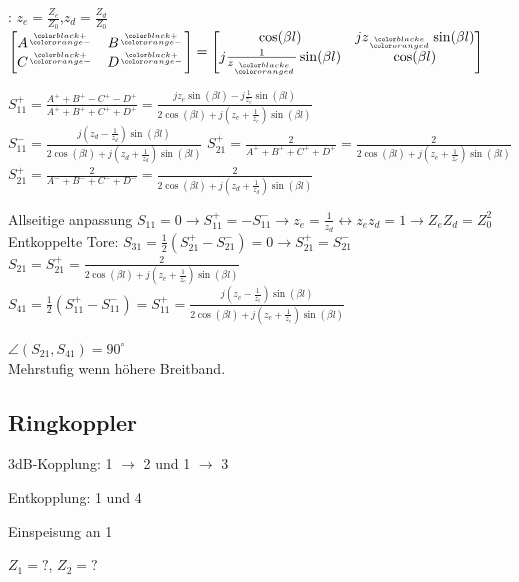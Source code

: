 :
$z_e = \frac{Z_e}{Z_0}$,$z_d = \frac{Z_d}{Z_0}$ \\
$\begin{bmatrix}
    A^\ggt{+}{-} & B^\ggt{+}{-} \\ C^{\ggt{+}{-}} & D^{\ggt{+}{-}}
\end{bmatrix} = \begin{bmatrix}
    \cos(\beta l) & jz_{\ggt{e}{d}}\sin(\beta l) \\
    j\frac{1}{z_{\ggt{e}{d}}}\sin(\beta l) & \cos(\beta l)
\end{bmatrix}$

$S_{11}^+ = \frac{A^+ + B^+ - C^+ - D^+}{A^+ + B^+ + C^+ + D^+} = \frac{jz_e\sin(\beta l) -
    j\frac{1}{z_e}\sin(\beta l) }{2\cos(\beta l) + j(z_e + \frac{1}{z_e}) \sin(\beta l)}$\\

$S_{11}^- = \frac{j(z_d - \frac{1}{z_d})\sin(\beta l) }{2\cos(\beta l) + j(z_d + \frac{1}{z_d}) \sin(\beta l)}$
$S_{21}^+ = \frac{2}{A^+ + B^+ + C^+ + D^+} = \frac{2}{2\cos(\beta l) + j(z_e + \frac{1}{z_e}) \sin(\beta l)}$\\
$S_{21}^+ = \frac{2}{A^- + B^- + C^- + D^-} = \frac{2}{2\cos(\beta l) + j(z_d + \frac{1}{z_d}) \sin(\beta l)}$

Allseitige anpassung $S_{11} = 0 \rightarrow S_{11}^+ = - S_{11}^- \rightarrow z_e = \frac{1}{z_d} \leftrightarrow z_ez_d = 1 \rightarrow Z_eZ_d = Z_0^2$
Entkoppelte Tore: $S_{31} = \frac{1}{2}(S_{21}^+ - S_{21}^-) = 0 \rightarrow S_{21}^+ = S_{21}^-$
$S_{21} = S_{21}^+ = \frac{2}{2\cos(\beta l) + j(z_e + \frac{1}{z_e}) \sin(\beta l)}$\\
$S_{41} = \frac{1}{2}(S_{11}^+ - S_{11}^-) = S_{11}^+ = \frac{j(z_e - \frac{1}{z_e})\sin(\beta l) }{2\cos(\beta l) + j(z_e + \frac{1}{z_e}) \sin(\beta l)}$

$\angle(S_{21}, S_{41}) = 90^\circ$\\
Mehrstufig wenn höhere Breitband.

\subsection{Ringkoppler}


\begin{pitemize}
    \item 3dB-Kopplung: 1 $\rightarrow$ 2 und 1 $\rightarrow$ 3
    \item Entkopplung: 1 und 4
    \item Einspeisung an 1
    \item $Z_1 = ?$, $Z_2 = ?$ 
\end{pitemize}


